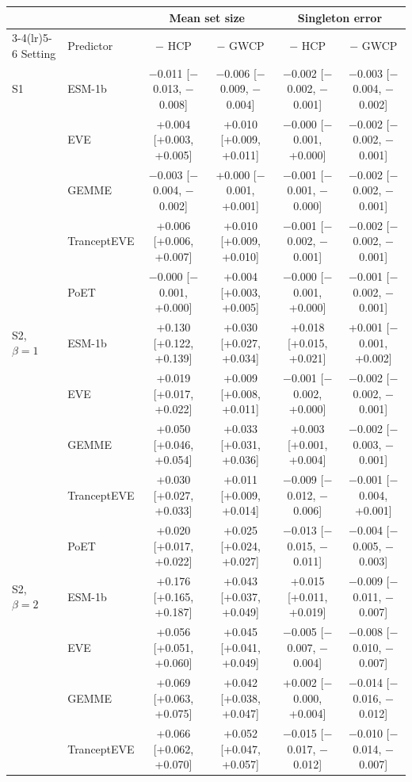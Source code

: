 \begin{tabular}{llcccc}
\toprule
 & & \multicolumn{2}{c}{Mean set size} & \multicolumn{2}{c}{Singleton error} \\
\cmidrule(lr){3-4}\cmidrule(lr){5-6}
Setting & Predictor & $-$ HCP & $-$ GWCP & $-$ HCP & $-$ GWCP \\
\midrule
S1 & ESM-1b & $-$0.011 [$-$0.013, $-$0.008] & $-$0.006 [$-$0.009, $-$0.004] & $-$0.002 [$-$0.002, $-$0.001] & $-$0.003 [$-$0.004, $-$0.002] \\
 & EVE & +0.004 [+0.003, +0.005] & +0.010 [+0.009, +0.011] & $-$0.000 [$-$0.001, +0.000] & $-$0.002 [$-$0.002, $-$0.001] \\
 & GEMME & $-$0.003 [$-$0.004, $-$0.002] & +0.000 [$-$0.001, +0.001] & $-$0.001 [$-$0.001, $-$0.000] & $-$0.002 [$-$0.002, $-$0.001] \\
 & TranceptEVE & +0.006 [+0.006, +0.007] & +0.010 [+0.009, +0.010] & $-$0.001 [$-$0.002, $-$0.001] & $-$0.002 [$-$0.002, $-$0.001] \\
 & PoET & $-$0.000 [$-$0.001, +0.000] & +0.004 [+0.003, +0.005] & $-$0.000 [$-$0.001, +0.000] & $-$0.001 [$-$0.002, $-$0.001] \\
\midrule
S2, $\beta=1$ & ESM-1b & +0.130 [+0.122, +0.139] & +0.030 [+0.027, +0.034] & +0.018 [+0.015, +0.021] & +0.001 [$-$0.001, +0.002] \\
 & EVE & +0.019 [+0.017, +0.022] & +0.009 [+0.008, +0.011] & $-$0.001 [$-$0.002, +0.000] & $-$0.002 [$-$0.002, $-$0.001] \\
 & GEMME & +0.050 [+0.046, +0.054] & +0.033 [+0.031, +0.036] & +0.003 [+0.001, +0.004] & $-$0.002 [$-$0.003, $-$0.001] \\
 & TranceptEVE & +0.030 [+0.027, +0.033] & +0.011 [+0.009, +0.014] & $-$0.009 [$-$0.012, $-$0.006] & $-$0.001 [$-$0.004, +0.001] \\
 & PoET & +0.020 [+0.017, +0.022] & +0.025 [+0.024, +0.027] & $-$0.013 [$-$0.015, $-$0.011] & $-$0.004 [$-$0.005, $-$0.003] \\
\midrule
S2, $\beta=2$ & ESM-1b & +0.176 [+0.165, +0.187] & +0.043 [+0.037, +0.049] & +0.015 [+0.011, +0.019] & $-$0.009 [$-$0.011, $-$0.007] \\
 & EVE & +0.056 [+0.051, +0.060] & +0.045 [+0.041, +0.049] & $-$0.005 [$-$0.007, $-$0.004] & $-$0.008 [$-$0.010, $-$0.007] \\
 & GEMME & +0.069 [+0.063, +0.075] & +0.042 [+0.038, +0.047] & +0.002 [$-$0.000, +0.004] & $-$0.014 [$-$0.016, $-$0.012] \\
 & TranceptEVE & +0.066 [+0.062, +0.070] & +0.052 [+0.047, +0.057] & $-$0.015 [$-$0.017, $-$0.012] & $-$0.010 [$-$0.014, $-$0.007] \\

\end{tabular}
